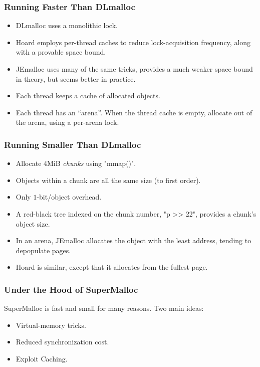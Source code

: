 \documentclass[xcolor=dvipsnames,14pt]{beamer}
\begin{document}
\begin{frame}
\frametitle{Running Faster Than DLmalloc}

\begin{itemize}
\item DLmalloc uses a monolithic lock.
\item Hoard employs per-thread caches to reduce lock-acquisition frequency, along with a provable space bound.
\item JEmalloc uses many of the same tricks, provides a much weaker space bound in theory, but seems better in practice.
\item Each thread keeps a cache of allocated objects.
\item Each thread has an ``arena''.  When the thread cache is empty, allocate out of the arena, using a per-arena lock.
\end{itemize}

\end{frame}

\begin{frame}[fragile]
\frametitle{Running Smaller Than DLmalloc}

\begin{itemize}
\item Allocate 4MiB \textit{chunks} using "mmap()".
\item Objects within a chunk are all the same size (to first order).
\item Only $1$-bit/object overhead.
\item A red-black tree indexed on the chunk number, "p >> 22", provides a chunk's object size.
\item In an arena, JEmalloc allocates the object with the least address,
tending to depopulate pages.
\item Hoard is similar, except that it allocates from the fullest page.
\end{itemize}
\end{frame}

\begin{frame}
\frametitle{Under the Hood of SuperMalloc}

SuperMalloc is fast and small for many reasons.  Two main ideas:
\begin{itemize}
\item Virtual-memory tricks.
\item Reduced synchronization cost.
\item Exploit Caching.
\end{itemize}
\end{frame}
\end{document}

